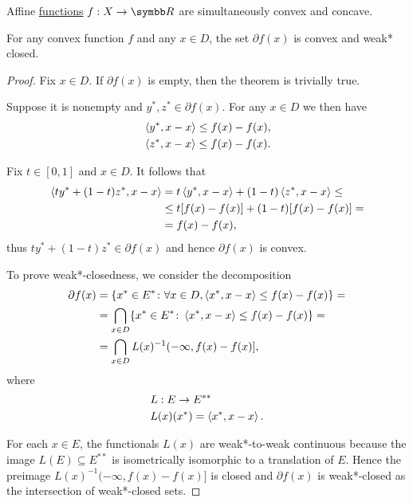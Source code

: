 \begin{definition}\label{def:affine_functions_concave_and_convex}
  Affine \hyperref[def:affine_operator]{functions} \( f: X \to \BR \) are simultaneously convex and concave.
\end{definition}

\begin{proposition}\label{thm:convex_subdifferential_is_convex_and_weak*_closed}\cite[exercise 1.10]{Phelps1993}
  For any convex function \( f \) and any \( x \in D \), the set \( \partial f(x) \) is convex and weak* closed.
\end{proposition}
\begin{proof}
  Fix \( x \in D \). If \( \partial f(x) \) is empty, then the theorem is trivially true.

  Suppose it is nonempty and \( y^*, z^* \in \partial f(x) \). For any \( x \in D \) we then have
  \begin{align*}
    &\left\langle y^*, x - x \right\rangle \leq f(x) - f(x), \\
    &\left\langle z^*, x - x \right\rangle \leq f(x) - f(x).
  \end{align*}

  Fix \( t \in [0, 1] \) and \( x \in D \). It follows that
  \begin{align*}
    \left\langle t y^* + (1-t) z^*, x - x \right\rangle
    &=
    t \left\langle y^*, x - x \right\rangle + (1-t) \left\langle z^*, x - x \right\rangle
    \leq \\ &\leq
    t [f(x) - f(x)] + (1-t) [f(x) - f(x)]
    = \\ &=
    f(x) - f(x),
  \end{align*}
  thus \( t y^* + (1-t)z^* \in \partial f(x) \) and hence \( \partial f(x) \) is convex.

  To prove weak*-closedness, we consider the decomposition
  \begin{align*}
    \partial f(x)
    &=
    \{ x^* \in E^* \colon \forall x \in D, \left\langle x^*, x - x \right\rangle \leq f(x) - f(x) \}
    = \\ &=
    \bigcap_{x \in D} \{ x^* \in E^* \colon \left\langle x^*, x - x \right\rangle \leq f(x) - f(x) \}
    = \\ &=
    \bigcap_{x \in D} L(x)^{-1} (-\infty, f(x) - f(x)],
  \end{align*}
  where
  \begin{align*}
    &L: E \to E^{**} \\
    &L(x)(x^*) = \left\langle x^*, x - x \right\rangle.
  \end{align*}

  For each \( x \in E \), the functionals \( L(x) \) are weak*-to-weak continuous because the image \( L(E) \subseteq E^{**} \) is isometrically isomorphic to a translation of \( E \). Hence the preimage \( L(x)^{-1} (-\infty, f(x) - f(x)] \) is closed and \( \partial f(x) \) is weak*-closed as the intersection of weak*-closed sets.
\end{proof}

